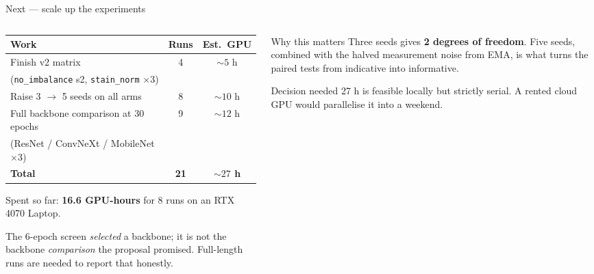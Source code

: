 \documentclass[aspectratio=169,11pt]{beamer}
\begin{document}
\begin{frame}{Next --- scale up the experiments}
  \begin{columns}[T]
    \begin{column}{0.54\textwidth}
      \scriptsize
      \begin{tabular}{@{}lcc@{}}
        \toprule
        \textbf{Work} & \textbf{Runs} & \textbf{Est.\ GPU} \\
        \midrule
        Finish v2 matrix & 4 & ${\sim}5$ h \\
        \quad (\texttt{no\_imbalance} s2, \texttt{stain\_norm} $\times$3) & & \\
        Raise 3 $\rightarrow$ 5 seeds on all arms & 8 & ${\sim}10$ h \\
        Full backbone comparison at 30 epochs & 9 & ${\sim}12$ h \\
        \quad (ResNet / ConvNeXt / MobileNet $\times$3) & & \\
        \midrule
        \textbf{Total} & \textbf{21} & \textbf{${\sim}27$ h} \\
        \bottomrule
      \end{tabular}

      \smallskip
      Spent so far: \textbf{16.6 GPU-hours} for 8 runs on an RTX 4070 Laptop.

      \smallskip
      The 6-epoch screen \emph{selected} a backbone; it is not the backbone
      \emph{comparison} the proposal promised. Full-length runs are needed to
      report that honestly.
    \end{column}
    \begin{column}{0.43\textwidth}
      \begin{block}{Why this matters}
        \scriptsize
        Three seeds gives \textbf{2 degrees of freedom}. Five seeds, combined
        with the halved measurement noise from EMA, is what turns the paired
        tests from indicative into informative.
      \end{block}
      \begin{alertblock}{Decision needed}
        \scriptsize
        27 h is feasible locally but strictly serial. A rented cloud GPU would
        parallelise it into a weekend.
      \end{alertblock}
    \end{column}
  \end{columns}
\end{frame}
\end{document}
